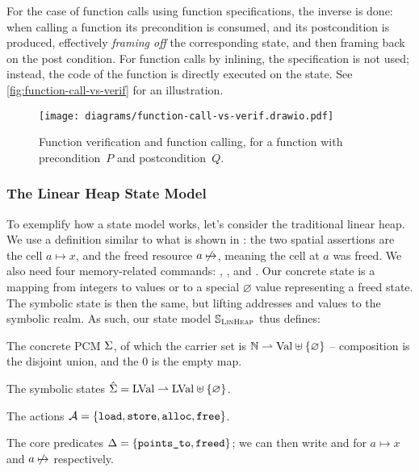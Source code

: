 For the case of function calls using function specifications, the inverse is done: when calling a function its precondition is consumed, and its postcondition is produced, effectively \emph{framing off} the corresponding state, and then framing back on the post condition. For function calls by inlining, the specification is not used; instead, the code of the function is directly executed on the state. See \autoref{fig:function-call-vs-verif} for an illustration.

\begin{figure}
	\centering
	\texttt{[image: diagrams/function-call-vs-verif.drawio.pdf]}
	\caption{Function verification and function calling, for a function with precondition~$P$ and postcondition~$Q$.}
	\label{fig:function-call-vs-verif}
\end{figure}

\subsubsection{The Linear Heap State Model}

To exemplify how a state model works, let's consider the traditional linear heap. We use a definition similar to what is shown in \cite{isl}: the two spatial assertions are the cell $a\mapsto x$, and the freed resource $a\not\mapsto$, meaning the cell at $a$ was freed. We also need four memory-related commands: \load, \store, \alloc{} and \free{}. Our concrete state is a mapping from integers to values or to a special $\varnothing$ value representing a freed state. The symbolic state is then the same, but lifting addresses and values to the symbolic realm. As such, our state model $\mathbb S_{\textsc{LinHeap}}$ thus defines: \begin{compactitem}
 \item The concrete PCM $\Sigma$, of which the carrier set is $\mathbb N\rightharpoonup \text{Val} \uplus \{\varnothing\}$ -- composition is the disjoint union, and the $0$ is the empty map.
 \item The symbolic states $\hat{\Sigma} = \text{LVal} \rightharpoonup \text{LVal} \uplus\{\varnothing\}$.
 \item The actions ${\cal{A}}=\{\texttt{load},\texttt{store},\texttt{alloc},\texttt{free}\}$.
 \item The core predicates $\Delta=\{\texttt{points\_to}, \texttt{freed}\}$; we can then write  and  for $a\mapsto x$ and $a\not\mapsto$ respectively.
 \end{compactitem}

